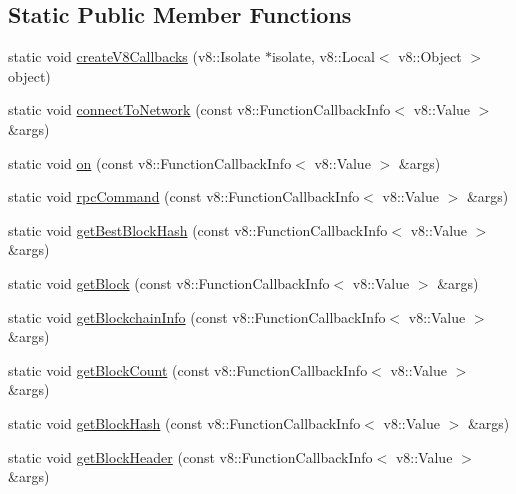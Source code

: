 \subsection*{Static Public Member Functions}
\begin{DoxyCompactItemize}
\item 
static void \mbox{\hyperlink{class_rad_j_a_v_1_1_blockchain_v1_a10f0c890d8d0b57ba3caa6d7c5059630}{create\+V8\+Callbacks}} (v8\+::\+Isolate $\ast$isolate, v8\+::\+Local$<$ v8\+::\+Object $>$ object)
\item 
static void \mbox{\hyperlink{class_rad_j_a_v_1_1_blockchain_v1_a605c859aae9df8f366d22f6e24f7277c}{connect\+To\+Network}} (const v8\+::\+Function\+Callback\+Info$<$ v8\+::\+Value $>$ \&args)
\item 
static void \mbox{\hyperlink{class_rad_j_a_v_1_1_blockchain_v1_a4be64461faec6feef1d9953d4e8583bb}{on}} (const v8\+::\+Function\+Callback\+Info$<$ v8\+::\+Value $>$ \&args)
\item 
static void \mbox{\hyperlink{class_rad_j_a_v_1_1_blockchain_v1_a5a2187e3071d17b22c2a825113ab73a4}{rpc\+Command}} (const v8\+::\+Function\+Callback\+Info$<$ v8\+::\+Value $>$ \&args)
\item 
static void \mbox{\hyperlink{class_rad_j_a_v_1_1_blockchain_v1_a4d8104f8249e96eed6147918e0f531c8}{get\+Best\+Block\+Hash}} (const v8\+::\+Function\+Callback\+Info$<$ v8\+::\+Value $>$ \&args)
\item 
static void \mbox{\hyperlink{class_rad_j_a_v_1_1_blockchain_v1_ac502b5cef8ac47306122feb731305532}{get\+Block}} (const v8\+::\+Function\+Callback\+Info$<$ v8\+::\+Value $>$ \&args)
\item 
static void \mbox{\hyperlink{class_rad_j_a_v_1_1_blockchain_v1_a6389167181776449a6cee8356c60ca14}{get\+Blockchain\+Info}} (const v8\+::\+Function\+Callback\+Info$<$ v8\+::\+Value $>$ \&args)
\item 
static void \mbox{\hyperlink{class_rad_j_a_v_1_1_blockchain_v1_a5ee24d8bfc4b7a6b401490fd41c45b2d}{get\+Block\+Count}} (const v8\+::\+Function\+Callback\+Info$<$ v8\+::\+Value $>$ \&args)
\item 
static void \mbox{\hyperlink{class_rad_j_a_v_1_1_blockchain_v1_a36f69eafb0eb84e1e1d31438e8491765}{get\+Block\+Hash}} (const v8\+::\+Function\+Callback\+Info$<$ v8\+::\+Value $>$ \&args)
\item 
static void \mbox{\hyperlink{class_rad_j_a_v_1_1_blockchain_v1_a31df1b6c4507053a23f51adeba222769}{get\+Block\+Header}} (const v8\+::\+Function\+Callback\+Info$<$ v8\+::\+Value $>$ \&args)

\end{DoxyCompactItemize}

